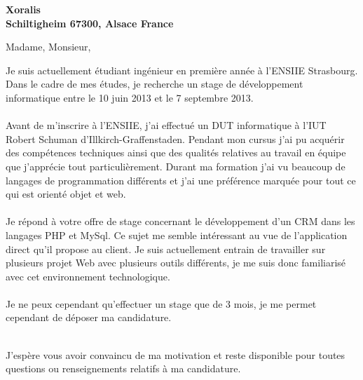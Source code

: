 \documentclass[11pt]{lettre}
\begin{document}
\begin{letter}{\textbf{Xoralis\\
Schiltigheim 67300, Alsace France\\
}} %
\def\concname{\textbf{Objet :~}} %
\opening{Madame, Monsieur,} %
Je suis actuellement étudiant ingénieur en première année à l'ENSIIE Strasbourg. Dans le cadre de mes études, je recherche un stage de développement informatique entre le 10 juin 2013 et le 7 septembre 2013.
\\ \\
Avant de m'inscrire à l’ENSIIE, j’ai effectué un DUT informatique à l’IUT Robert Schuman
d’Illkirch-Graffenstaden. Pendant mon cursus j’ai pu acquérir des compétences techniques ainsi que
des qualités relatives au travail en équipe que j’apprécie tout particulièrement. Durant ma formation j’ai
vu beaucoup de langages de programmation différents et j’ai une préférence marquée pour tout ce qui
est orienté objet et web.
\\ \\
Je répond à votre offre de stage concernant le développement d'un CRM dans les langages PHP et MySql. Ce sujet me semble intéressant au vue de l'application direct qu'il propose au client. Je suis actuellement entrain de travailler sur plusieurs projet Web avec plusieurs outils différents, je me suis donc familiarisé avec cet environnement technologique.
\\ \\
Je ne peux cependant qu'effectuer un stage que de 3 mois, je me permet cependant de déposer ma candidature.
\\ \\

\closing{J'espère vous avoir convaincu de ma motivation et reste disponible pour toutes questions ou
renseignements relatifs à ma candidature.} %
 
\end{letter}
\end{document}

